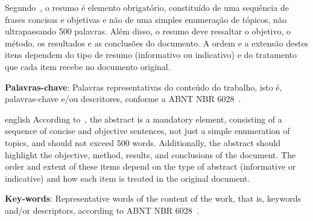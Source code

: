 \documentclass[
    12pt,				       %
    openright,			       %
    oneside,			       %
    a4paper,			       %
    chapter=TITLE,             %
    sumario=tradicional,       %
    english,			        %
    brazil, 				    %
 ]{abntex2}
\begin{document}
\begin{resumo}
    \noindent
    Segundo~, o resumo é elemento obrigat\'orio, constitu\'ido de uma sequ\^encia de frases concisas e objetivas e n\~ao de uma simples enumera\c c\~ao de t\'opicos, não ultrapassando 500 palavras. Além disso, o resumo deve ressaltar o objetivo, o método, os resultados e as conclusões do documento. A ordem e a extensão destes itens dependem do tipo de resumo (informativo ou indicativo) e do tratamento que cada item recebe no documento original.
    \vspace{\onelineskip}

    \noindent
    \textbf{Palavras-chave}: Palavras representativas do conteúdo do trabalho, isto é, palavras-chave e/ou descritores, conforme a ABNT NBR 6028~\cite{NBR6028:2003}.
\end{resumo}

\begin{resumo}[Abstract]
    \begin{otherlanguage*}{english}
        \noindent
        According to~\cite{NBR6028:2003}, the abstract is a mandatory element, consisting of a sequence of concise and objective sentences, not just a simple enumeration of topics, and should not exceed 500 words. Additionally, the abstract should highlight the objective, method, results, and conclusions of the document. The order and extent of these items depend on the type of abstract (informative or indicative) and how each item is treated in the original document.
        \vspace{\onelineskip}

        \noindent
        \textbf{Key-words}: Representative words of the content of the work, that is, keywords and/or descriptors, according to ABNT NBR 6028~\cite{NBR6028:2003}.
    \end{otherlanguage*}
\end{resumo}

\listoffigures*
\cleardoublepage

\listofquadros*
\cleardoublepage

\listoftables*
\cleardoublepage
\end{document}
